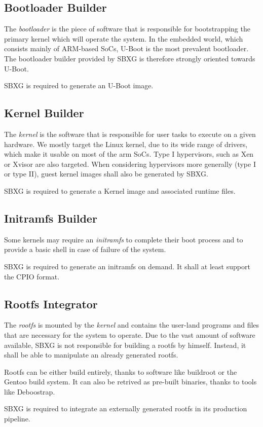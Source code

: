 \documentclass{article}
\begin{document}
\subsection{Bootloader Builder}

The \emph{bootloader} is the piece of software that is responsible for
bootstrapping the primary kernel which will operate the system. In the embedded
world, which consists mainly of ARM-based SoCs, U-Boot is the most prevalent
bootloader. The bootloader builder provided by SBXG is therefore strongly
oriented towards U-Boot.

\begin{requirement}
SBXG is required to generate an U-Boot image.
\end{requirement} 


\subsection{Kernel Builder}

The \emph{kernel} is the software that is responsible for user tasks to execute
on a given hardware. We mostly target the Linux kernel, due to its wide range of
drivers, which make it usable on most of the arm SoCs.
Type I hypervisors, such as Xen or Xvisor are also targeted. When considering
hypervisors more generally (type I or type II), guest kernel images shall also
be generated by SBXG.

\begin{requirement}
SBXG is required to generate a Kernel image and associated runtime files.
\end{requirement}

\subsection{Initramfs Builder}

Some kernels may require an \emph{initramfs} to complete their boot process and
to provide a basic shell in case of failure of the system.

\begin{requirement}
SBXG is required to generate an initramfs on demand. It shall at least support
the CPIO format.
\end{requirement}

\subsection{Rootfs Integrator}

The \emph{rootfs} is mounted by the \emph{kernel} and contains the user-land
programs and files that are necessary for the system to operate. Due to the vast
amount of software available, SBXG is not responsible for building a rootfs by
himself. Instead, it shall be able to manipulate an already generated rootfs.

Rootfs can be either build entirely, thanks to software like buildroot or the
Gentoo build system. It can also be retrived as pre-built binaries, thanks to
tools like Deboostrap.

\begin{requirement}
SBXG is required to integrate an externally generated rootfs in its production
pipeline.
\end{requirement}
\end{document}
